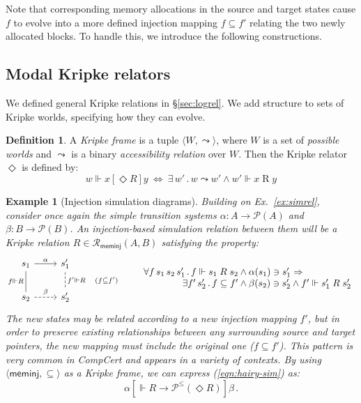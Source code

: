 \documentclass[11pt,oneside,draft]{book}
\newtheorem{example}[theorem]{Example}
\theoremstyle{definition}
\newtheorem{definition}[theorem]{Definition}
\newcommand{\kw}[1]{\ensuremath{ \mathsf{#1} }}
\newcommand{\ifr}[1]{\mathrel{[{#1}]}}
\begin{document}
Note that corresponding memory allocations
in the source and target states cause $f$ to
evolve into a more defined injection mapping $f \subseteq f'$
relating the two newly allocated blocks.
To handle this,
we introduce the following constructions.


\subsection{Modal Kripke relators} %

We defined general Kripke relations in \S\ref{sec:logrel}.
We add structure to sets of Kripke worlds,
specifying how they can evolve.

\begin{definition} %
A \emph{Kripke frame} is a tuple
$\langle W, {\leadsto} \rangle$, where
$W$ is a set of \emph{possible worlds} and
$\leadsto$ is a
binary \emph{accessibility relation} over $W$.
Then the Kripke relator $\Diamond$ is defined by:
\[
  w \Vdash x \ifr{\Diamond R} y \: \Leftrightarrow \:
    \exists \, w' \,.\, w \leadsto w' \wedge
      w' \Vdash x \mathrel{R} y
\]
\end{definition}

\begin{example}[Injection simulation diagrams] \label{ex:sim} %
Building on Ex.~\ref{ex:simrel},
consider once again the simple transition systems
$\alpha : A \rightarrow \mathcal{P}(A)$ and
$\beta : B \rightarrow \mathcal{P}(B)$.
An injection-based simulation relation between them
will be a Kripke relation
$R \in \mathcal{R}_\kw{meminj}(A, B)$
satisfying the property:
\begin{equation}
    \label{eqn:hairy-sim}
  \begin{tikzcd}[scale=0.8]
    s_1 \arrow[r, "\alpha"]
        \arrow[d, dash, "f \Vdash R"'] &
    s_1' \arrow[d, dashed, dash, "f' \Vdash R \quad (f \subseteq f')"] \\
    s_2 \arrow[r, dashed, "\beta"] &
    s_2'
  \end{tikzcd}
  \qquad
    \begin{array}{r@{}l}
    \forall f \, s_1 \, s_2 \, s_1' \,.\,
      f \Vdash s_1 \mathrel{R} s_2 &{} \wedge
      \alpha(s_1) \ni s_1' \Rightarrow \\
    \exists f' \, s_2' \,.\,
      f \subseteq f' &{} \wedge
      \beta(s_2) \ni s_2' \wedge
      f' \Vdash s_1' \mathrel{R} s_2'
    \end{array}
\end{equation}
The new states may be related according to
a new injection mapping $f'$,
but in order to preserve existing relationships
between any surrounding source and target pointers,
the new mapping must include
the original one ($f \subseteq f'$).
This pattern is very common in CompCert
and appears in a variety of contexts.
By using $\langle \kw{meminj}, {\subseteq} \rangle$
as a Kripke frame,
we can express
(\ref{eqn:hairy-sim}) as:
\[
  \alpha \ifr{\Vdash R \rightarrow \mathcal{P}^\le(\Diamond R)} \beta \,.
\]
\end{example}
\end{document}
